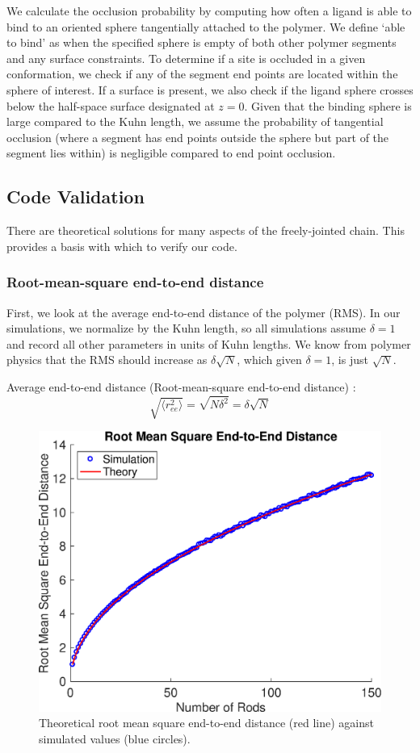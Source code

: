 \documentclass[../AdvancementSummary.tex]{subfiles}
\begin{document}
We calculate the occlusion probability by computing how often a ligand is able to bind to an oriented sphere tangentially attached to the polymer. We define `able to bind' as when the specified sphere is empty of both other polymer segments and any surface constraints. To determine if a site is occluded in a given conformation, we check if any of the segment end points are located within the sphere of interest. If a surface is present, we also check if the ligand sphere crosses below the half-space surface designated at $z=0$. Given that the binding sphere is large compared to the Kuhn length, we assume the probability of tangential occlusion (where a segment has end points outside the sphere but part of the segment lies within) is negligible compared to end point occlusion. 


\subsection{Code Validation}
There are theoretical solutions for many aspects of the freely-jointed chain. This provides a basis with which to verify our code. 

\subsubsection{Root-mean-square end-to-end distance}
First, we look at the average end-to-end distance of the polymer (RMS). In our simulations, we normalize by the Kuhn length, so all simulations assume $\delta = 1$ and record all other parameters in units of Kuhn lengths. We know from polymer physics that the RMS should increase as $\delta \sqrt{N}$, which given $\delta = 1$, is just $\sqrt{N}$.

Average end-to-end distance (Root-mean-square end-to-end distance) \cite{Reeves2011}:
\begin{equation*}
\sqrt{\langle r_{ee}^2 \rangle} = \sqrt{N\delta^2} = \delta \sqrt{N}
\end{equation*}

\begin{figure}[H]
\begin{center}
\includegraphics[width=0.5\linewidth]{ModelConfirmationFigures/RMSEndtoEnd.eps}
\caption{Theoretical root mean square end-to-end distance (red line) against simulated values (blue circles). \label{fig: RMS}}
\end{center}
\end{figure}
\end{document}
